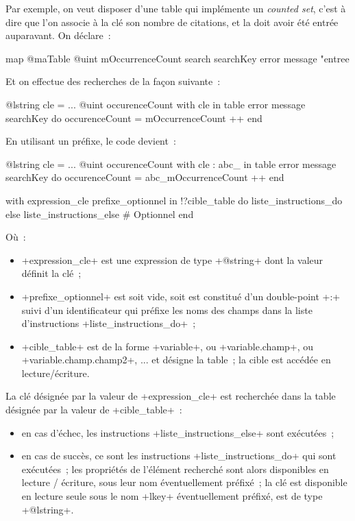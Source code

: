Par exemple, on veut disposer d'une table qui implémente un \emph{counted set}, c'est à dire que l'on associe à la clé son nombre de citations, et la doit avoir été entrée auparavant. On déclare~:
\begin{galgas3}
map @maTable {
  @uint mOccurrenceCount
  search searchKey error message "entree %
}
\end{galgas3}

Et on effectue des recherches de la façon suivante~:
\begin{galgas3}
@lstring cle = ...
@uint occurenceCount
with cle in table error message searchKey do
  occurenceCount = mOccurrenceCount ++
end
\end{galgas3}

En utilisant un préfixe, le code devient~:
\begin{galgas3}
@lstring cle = ...
@uint occurenceCount
with cle : abc_ in table error message searchKey do
  occurenceCount = abc_mOccurrenceCount ++
end
\end{galgas3}







\begin{galgas3}
with expression_cle prefixe_optionnel in !?cible_table
do
  liste_instructions_do
else
  liste_instructions_else # Optionnel
end
\end{galgas3}


Où~:
\begin{itemize}
  \item \ggst+expression_cle+ est une expression de type \ggst+@string+ dont la valeur définit la clé~;
  \item \ggst+prefixe_optionnel+ est soit vide, soit est constitué d'un double-point \ggst+:+ suivi d'un identificateur qui préfixe les noms des champs dans la liste d'instructions \ggst+liste_instructions_do+~;
  \item \ggst+cible_table+ est de la forme \ggst+variable+, ou  \ggst+variable.champ+, ou \ggst+variable.champ.champ2+, ... et désigne la table~; la cible est accédée en lecture/écriture.
\end{itemize}

La clé désignée par la valeur de \ggst+expression_cle+ est recherchée dans la table désignée par la valeur de \ggst+cible_table+~:
\begin{itemize}
  \item en cas d'échec, les instructions \ggst+liste_instructions_else+ sont exécutées~;
  \item en cas de succès, ce sont les instructions \ggst+liste_instructions_do+ qui sont exécutées~; les propriétés de l'élément recherché sont alors disponibles en lecture / écriture, sous leur nom éventuellement préfixé~; la clé est disponible en lecture seule sous le nom \ggst+lkey+ éventuellement préfixé, est de type \ggst+@lstring+.
\end{itemize}

